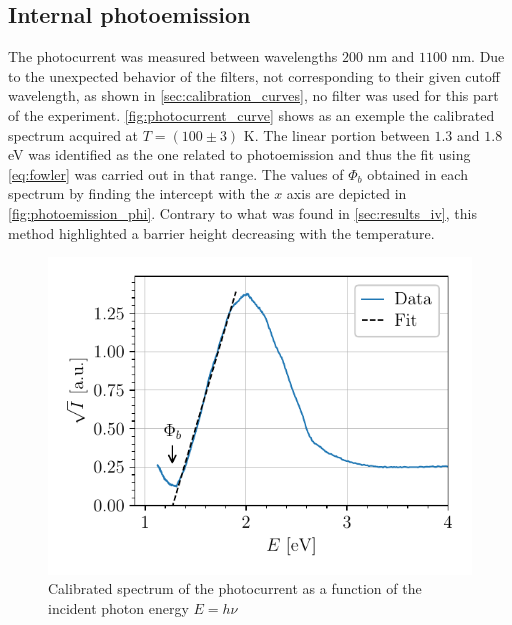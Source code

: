 \begin{figure}[htbp]
\begin{minipage}[t]{0.49\textwidth}
        \label{fig:richardson}
    \end{minipage}
\end{figure}

\subsection{Internal photoemission} \label{sec:results_photoemission}
The photocurrent was measured between wavelengths $200$ nm and $1100$ nm.
Due to the unexpected behavior of the filters, not corresponding to their given cutoff wavelength, as shown in \autoref{sec:calibration_curves}, no filter was used for this part of the experiment.
\autoref{fig:photocurrent_curve} shows as an exemple the calibrated spectrum acquired at $T = (100\pm3)$ K.
The linear portion between $1.3$ and $1.8$ eV was identified as the one related to photoemission and thus the fit using \autoref{eq:fowler} was carried out in that range.
The values of $\Phi_b$ obtained in each spectrum by finding the intercept with the $x$ axis are depicted in \autoref{fig:photoemission_phi}.
Contrary to what was found in  \autoref{sec:results_iv}, this method highlighted a barrier height decreasing with the temperature.



\begin{figure}[htbp]
    \centering
    \includegraphics[scale=1]{figures/photocurrent_curve.pdf}
    \caption{Calibrated spectrum of the photocurrent as a function of the incident photon energy $E=h\nu$}
    \label{fig:photocurrent_curve}
\end{figure}

